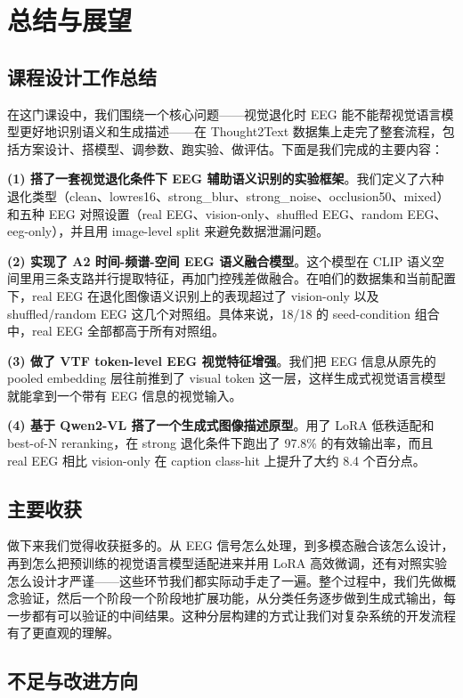 \section{总结与展望}

\subsection{课程设计工作总结}

在这门课设中，我们围绕一个核心问题——视觉退化时 EEG 能不能帮视觉语言模型更好地识别语义和生成描述——在 Thought2Text 数据集上走完了整套流程，包括方案设计、搭模型、调参数、跑实验、做评估。下面是我们完成的主要内容：

\textbf{(1) 搭了一套视觉退化条件下 EEG 辅助语义识别的实验框架}。我们定义了六种退化类型（clean、lowres16、strong\_blur、strong\_noise、occlusion50、mixed）和五种 EEG 对照设置（real EEG、vision-only、shuffled EEG、random EEG、eeg-only），并且用 image-level split 来避免数据泄漏问题。

\textbf{(2) 实现了 A2 时间-频谱-空间 EEG 语义融合模型}。这个模型在 CLIP 语义空间里用三条支路并行提取特征，再加门控残差做融合。在咱们的数据集和当前配置下，real EEG 在退化图像语义识别上的表现超过了 vision-only 以及 shuffled/random EEG 这几个对照组。具体来说，18/18 的 seed-condition 组合中，real EEG 全部都高于所有对照组。

\textbf{(3) 做了 VTF token-level EEG 视觉特征增强}。我们把 EEG 信息从原先的 pooled embedding 层往前推到了 visual token 这一层，这样生成式视觉语言模型就能拿到一个带有 EEG 信息的视觉输入。

\textbf{(4) 基于 Qwen2-VL 搭了一个生成式图像描述原型}。用了 LoRA 低秩适配和 best-of-N reranking，在 strong 退化条件下跑出了 97.8\% 的有效输出率，而且 real EEG 相比 vision-only 在 caption class-hit 上提升了大约 8.4 个百分点。

\subsection{主要收获}

做下来我们觉得收获挺多的。从 EEG 信号怎么处理，到多模态融合该怎么设计，再到怎么把预训练的视觉语言模型适配进来并用 LoRA 高效微调，还有对照实验怎么设计才严谨——这些环节我们都实际动手走了一遍。整个过程中，我们先做概念验证，然后一个阶段一个阶段地扩展功能，从分类任务逐步做到生成式输出，每一步都有可以验证的中间结果。这种分层构建的方式让我们对复杂系统的开发流程有了更直观的理解。

\subsection{不足与改进方向}

